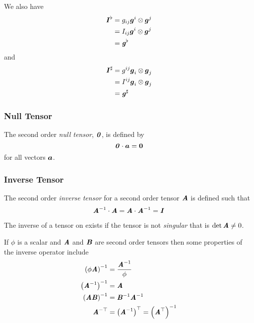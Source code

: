 We also have
\begin{equation}
  \begin{aligned}
      \boldsymbol{\mathit{ I }}  ^{\flat}&=g_{ij}  \boldsymbol{g} ^{i} \otimes  \boldsymbol{g} ^{j}  \\
    &=I_{ij}  \boldsymbol{g} ^{i} \otimes  \boldsymbol{g} ^{j}  \\
    &=\boldsymbol{\mathit{g}}^{\flat}
  \end{aligned}
\end{equation}
and
\begin{equation}
  \begin{aligned}
       \boldsymbol{\mathit{ I }}  ^{\sharp} &=g^{ij}  \boldsymbol{g} _{i} \otimes  \boldsymbol{g} _{j}   \\
    &=I^{ij}  \boldsymbol{g} _{i} \otimes  \boldsymbol{g} _{j}  \\
    &= \boldsymbol{\mathit{g}}^{\sharp} 
  \end{aligned}
\end{equation}

\subsubsection{Null Tensor}
\label{subsubsec:NullTensorSecondOrder}

The second order \emph{null tensor}, $ \boldsymbol{\mathit{ 0 }} $, is defined by
\begin{equation}
  \dotprod{\nulltensortwo}{\vectr{a}}=\nulltensorone
  \label{eqn:DefinitionNullSecondOrder}
\end{equation}
for all vectors $ \boldsymbol{a} $.

\subsubsection{Inverse Tensor}
\label{subsubsec:InverseTensorSecondOrder}

The second order \emph{inverse tensor} for a second order tensor
$\boldsymbol{\mathit{A}}$ is defined such that
\begin{equation}
   {\ensuremath{\boldsymbol{\mathit{A}}}}^{-1}  \cdot  \boldsymbol{\mathit{A}} = \boldsymbol{\mathit{A}}  \cdot  {\ensuremath{\boldsymbol{\mathit{A}}}}^{-1} =  \boldsymbol{\mathit{ I }}  
\end{equation}

The inverse of a tensor on exists if the tensor is not \emph{singular} that is
$\det \boldsymbol{\mathit{A}}\neq 0$.

If $\phi$ is a scalar and $\boldsymbol{\mathit{A}}$ and $\boldsymbol{\mathit{B}}$ are second order tensors then some
properties of the inverse operator include
\begin{align}
  \inverse{\pbrac{\phi\tensortwo{A}}}&=\dfrac{\inverse{\tensortwo{A}}}{\phi}
  \label{eqn:ScaleInverseTensorTwo} \\
  \inverse{\pbrac{\inverse{\tensortwo{A}}}}&=\tensortwo{A}
  \label{eqn:InverseInverseTensorTwo} \\
  \inverse{\pbrac{\tensortwo{A}\tensortwo{B}}}&=\inverse{\tensortwo{B}}\inverse{\tensortwo{A}}
  \label{eqn:ProductInverseTensorTwo} \\
  \invtranspose{\tensortwo{A}}&=\transpose{\pbrac{\inverse{\tensortwo{A}}}}=
  \inverse{\pbrac{\transpose{\tensortwo{A}}}}
  \label{eqn:InverseTransposeInverseTensorTwo}
\end{align}

